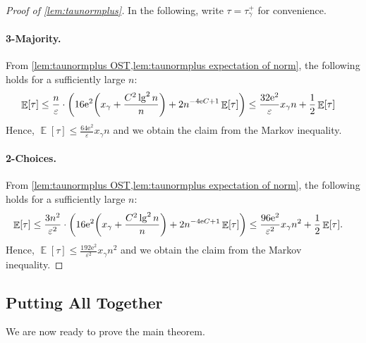 \documentclass[letterpaper,11pt]{article}
\DeclareMathOperator*{\E}{\mathbb{E}}
\renewcommand{\epsilon}{\varepsilon}
\newcommand{\e}{\mathrm{e}}
\newcommand{\alphanorm}{\gamma}
\newcommand{\taunormplus}{\tau^{+}_{\alphanorm}}
\newcommand{\xnorm}{x_{\alphanorm}}
\begin{document}
\begin{proof}[Proof of \cref{lem:taunormplus}]
    In the following, write $\tau=\taunormplus$ for convenience.

    \paragraph{3-Majority.}
    From \cref{lem:taunormplus OST,lem:taunormplus expectation of norm}, the following holds for a sufficiently large $n$:
    \begin{align*}
        \E[\tau]
        &\leq \frac{n}{\epsilon}\cdot \qty(16\e^2\qty(\xnorm+\frac{C^2\lg^2n}{n})+2n^{-4\e C+1}\E[\tau])
        \leq \frac{32\e^2}{\epsilon}\xnorm n +\frac{1}{2}\E[\tau]
    \end{align*}
    Hence, $\E[\tau]\leq \frac{64\e^2}{\epsilon}\xnorm n$ and we obtain the claim from the Markov inequality.

    \paragraph{2-Choices.}
    From \cref{lem:taunormplus OST,lem:taunormplus expectation of norm}, the following holds for a sufficiently large $n$:
    \begin{align*}
        \E[\tau]
        &\leq \frac{3n^2}{\epsilon^2}\cdot \qty(16\e^2\qty(\xnorm+\frac{C^2\lg^2n}{n})+2n^{-4\e C+1}\E[\tau])
        \leq \frac{96\e^2}{\epsilon^2}\xnorm n^2 +\frac{1}{2}\E[\tau].
    \end{align*}
    Hence, $\E[\tau]\leq \frac{192\e^2}{\epsilon^2}\xnorm n^2$ and we obtain the claim from the Markov inequality.
  \end{proof}





\subsection{Putting All Together} \label{sec:proof of main theorem}
We are now ready to prove the main theorem.
\end{document}
